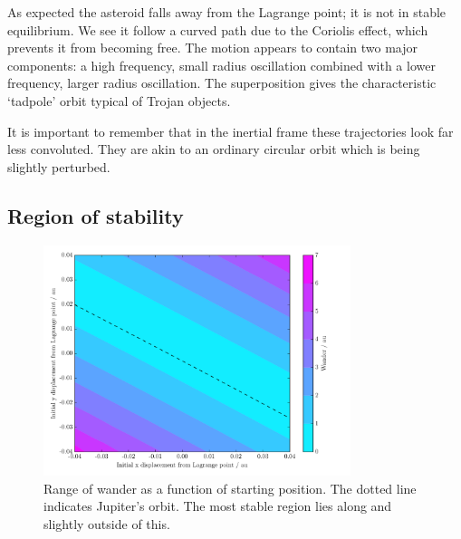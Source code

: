 \documentclass[a4paper]{article}
\begin{document}
    As expected the asteroid falls away from the Lagrange point; it is not
    in stable equilibrium. We see it follow a curved path due to the Coriolis
    effect, which prevents it from becoming free. The motion appears to contain
    two major components: a high frequency, small radius oscillation combined
    with a lower frequency, larger radius oscillation. The superposition gives
    the characteristic `tadpole' orbit typical of Trojan objects.

    It is important to remember that in the inertial frame these trajectories
    look far less convoluted. They are akin to an ordinary circular orbit which
    is being slightly perturbed.
    
    \subsection{Region of stability}
      \label{sec:regionofstability}
      \begin{figure}
        \centering
        \caption{Range of wander as a function of starting position. The dotted
        line indicates Jupiter's orbit. The most stable region lies along
        and slightly outside of this.}
        \label{fig:offsetplot}
        \includegraphics[width=0.8\textwidth]{figures/offset_plot}
      \end{figure}
\end{document}
